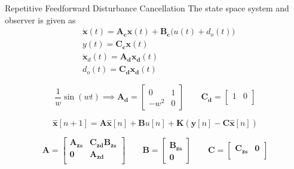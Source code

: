 \documentclass[10pt]{beamer}
\begin{document}
\begin{frame}{Repetitive Feedforward Disturbance Cancellation}
The state space system and observer is given as
  \begin{subequations}
    \label{eq:sys12}
    \begin{alignat}{2}
      \label{eq:sys1}
      & \mathbf{\dot{x}}(t) = \mathbf{A_cx}(t) + \mathbf{B_c}\big(u(t) + d_o(t)\big) \\
      \label{eq:sys2}
      & y(t) = \mathbf{C_cx}(t) \\
      \label{eq:dist1}
      & \mathbf{\dot{x}}_d(t) = \mathbf{A_dx_d}(t) \\
      \label{eq:dist2}
      & d_o(t) = \mathbf{C_dx_d}(t)
    \end{alignat}
  \end{subequations}

  \begin{equation*}
    \label{eq:sinm}
    \frac{1}{w}\sin(wt)
    \implies
    \mathbf{A_d} =
      \begin{bmatrix}
         0 & 1\\[0.3em]
         -w^2 & 0
       \end{bmatrix}
       \qquad
    \mathbf{C_d} =
      \begin{bmatrix}
          1 & 0\\
      \end{bmatrix}
  \end{equation*}

  \begin{equation*}
    \label{eq:obs}
    \mathbf{\hat{x}}[n + 1] = \mathbf{A\hat{x}}[n] + \mathbf{B}u[n] + \mathbf{K}(\mathbf{y}[n] - \mathbf{C\hat{x}}[n])
  \end{equation*}

  \begin{equation*}
    \label{eq:augumented}
    \mathbf{A} =
      \begin{bmatrix}
         \mathbf{A_{zs}} & \mathbf{C_{zd}B_{zs}}\\[0.3em]
         \mathbf{0} & \mathbf{A_{zd}}\\
       \end{bmatrix}
       \qquad
    \mathbf{B} =
      \begin{bmatrix}
          \mathbf{B_{zs}}\\
          \mathbf{0}
      \end{bmatrix}
       \qquad
    \mathbf{C} =
      \begin{bmatrix}
          \mathbf{C_{zs}} & \mathbf{0}\\
      \end{bmatrix}
  \end{equation*}
\end{frame}
\end{document}
